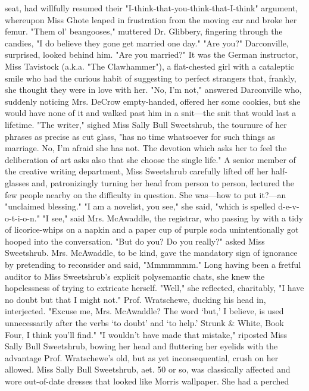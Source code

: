seat, had willfully resumed their "I-think-that-you-think-that-I-think"
argument, whereupon Miss Ghote leaped in frustration from the moving car and
broke her femur.
  "Them ol' beangooses," muttered Dr. Glibbery, fingering through the candies,
"I do believe they gone get married one day."
  "Are you?" Darconville, surprised, looked behind him. "Are you married?" It
was the German instructor, Miss Tavistock (a.k.a. "The Clawhammer"), a
flat-chested girl with a cataleptic smile who had the curious habit of
suggesting to perfect strangers that, frankly, she thought they were in love
with her.
  "No, I'm not," answered Darconville who, suddenly noticing Mrs. DeCrow
empty-handed, offered her some cookies, but she would have none of it and walked
past him in a snit---the snit that would last a lifetime.
  "The writer," sighed Miss Sally Bull Sweetshrub, the tournure of her phrases
as precise as cut glass, "has no time whatsoever for such things as marriage.
No, I'm afraid she has not. The devotion which asks her to feel the deliberation
of art asks also that she choose the single life." A senior member of the
creative writing department, Miss Sweetshrub carefully lifted off her
half-glasses and, patronizingly turning her head from person to person, lectured
the few people nearby on the difficulty in question. She was---how to put it?---an
"unclaimed blessing." "I am a novelist, you see," she said, "which is spelled
d-e-v-o-t-i-o-n."
  "I see," said Mrs. McAwaddle, the registrar, who passing by with a tidy of
licorice-whips on a napkin and a paper cup of purple soda unintentionally got
hooped into the conversation.
  "But do you? Do you really?" asked Miss Sweetshrub.
  Mrs. McAwaddle, to be kind, gave the mandatory sign of ignorance by pretending
to reconsider and said, "Mmmmmmm." Long having been a fretful auditor to Miss
Sweetshrub's explicit polysemantic chats, she knew the hopelessness of trying to
extricate herself. "Well," she reflected, charitably, "I have no doubt but that
I might not."
  Prof. Wratschewe, ducking his head in, interjected. "Excuse me, Mrs.
McAwaddle? The word `but,' I believe, is used unnecessarily after the verbs `to
doubt' and `to help.' Strunk \& White, Book Four, I think you'll find."
  "I wouldn't have made that mistake," riposted Miss Sally Bull Sweetshrub,
bowing her head and fluttering her eyelids with the advantage Prof. Wratschewe's
old, but as yet inconsequential, crush on her allowed.
  Miss Sally Bull Sweetshrub, aet. 50 or so, was classically affected and wore
out-of-date dresses that looked like Morris wallpaper. She had a perched
